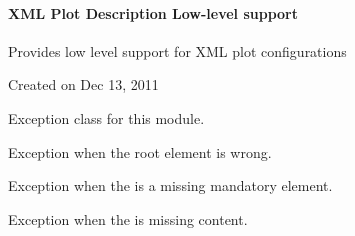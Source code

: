\documentclass[letterpaper,10pt,english]{sphinxmanual}
\begin{document}
\paragraph{XML Plot Description Low-level support}
\label{\detokenize{ref/util/plot/XMLCfg:module-TotalDepth.util.plot.XMLCfg}}\label{\detokenize{ref/util/plot/XMLCfg::doc}}\label{\detokenize{ref/util/plot/XMLCfg:xml-plot-description-low-level-support}}
Provides low level support for XML plot configurations

Created on Dec 13, 2011

\begin{fulllineitems}
\label{\detokenize{ref/util/plot/XMLCfg:TotalDepth.util.plot.XMLCfg.ExceptionXMLCfg}}
Exception class for this module.

\end{fulllineitems}


\begin{fulllineitems}
\label{\detokenize{ref/util/plot/XMLCfg:TotalDepth.util.plot.XMLCfg.ExceptionXMLCfgWrongRootElem}}
Exception when the root element is wrong.

\end{fulllineitems}


\begin{fulllineitems}
\label{\detokenize{ref/util/plot/XMLCfg:TotalDepth.util.plot.XMLCfg.ExceptionXMLCfgMissingElem}}
Exception when the is a missing mandatory element.

\end{fulllineitems}


\begin{fulllineitems}
\label{\detokenize{ref/util/plot/XMLCfg:TotalDepth.util.plot.XMLCfg.ExceptionXMLCfgNoContent}}
Exception when the is missing content.

\end{fulllineitems}
\end{document}
